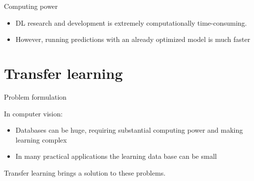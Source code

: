 \documentclass[xcolor=pdftex,dvipsnames,table,mathserif]{beamer}
\begin{document}
\begin{frame}{Computing power}

  \begin{alertblock}{}
    \begin{itemize}
    \item   DL research and development is extremely computationally time-consuming.
    \item   However, running predictions with an already optimized model is much faster
    \end{itemize}
  \end{alertblock}
\end{frame}


\section{Transfer learning}

\begin{frame}{Problem formulation}

  In computer vision:
\begin{itemize}
\item Databases can be huge, requiring substantial computing power and making learning complex
\item In many practical applications the learning data base can be small
\end{itemize}

Transfer learning brings a solution to these problems.

\end{frame}
\end{document}
